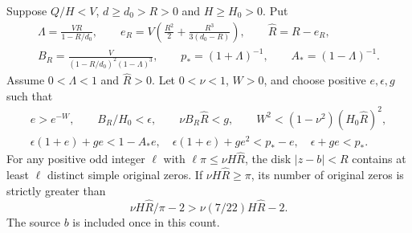 \begin{lemma}\label{lt:inverse-log}\label{lt:odd-pi}
Suppose $Q/H<V$, $d\ge d_0>R>0$ and $H\ge H_0>0$. Put
\begin{gather*}
 \Lambda=\frac{VR}{1-R/d_0},\qquad
 e_R=V\left(\frac{R^2}{2}+\frac{R^3}{3(d_0-R)}\right),\qquad
 \widehat R=R-e_R,\\
 B_R=\frac{V}{(1-R/d_0)^2(1-\Lambda)^3},\qquad
 p_*=(1+\Lambda)^{-1},\qquad A_*=(1-\Lambda)^{-1}.
\end{gather*}
Assume $0<\Lambda<1$ and $\widehat R>0$. Let $0<\nu<1$, $W>0$,
and choose positive $e,\epsilon,g$ such that
\begin{gather}
 e>e^{-W},\qquad B_R/H_0<\epsilon,\qquad
 \nu B_R\widehat R<g,\qquad
 W^2<(1-\nu^2)(H_0\widehat R)^2,\label{lt:inverse-corner}\\
 \epsilon(1+e)+ge<1-A_*e,\quad
 \epsilon(1+e)+ge^2<p_*-e,\quad
 \epsilon+ge<p_*.\label{lt:inverse-sides}
\end{gather}
For any positive odd integer $\ell$ with
$\ell\pi\le\nu H\widehat R$, the disk $|z-b|<R$ contains at
least $\ell$ distinct simple original zeros. If
$\nu H\widehat R\ge\pi$, its number of original zeros is
strictly greater than
\begin{equation}\label{lt:inverse-density}
 \nu H\widehat R/\pi-2>\nu(7/22)H\widehat R-2.
\end{equation}
The source $b$ is included once in this count.
\end{lemma}
